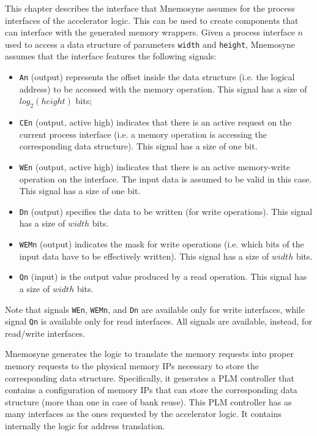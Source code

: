 This chapter describes the interface that {\sc Mnemosyne} assumes for
the process interfaces of the accelerator logic. This can be used to
create components that can interface with the generated memory
wrappers.
Given a process interface $n$ used to access a data structure of parameters {\tt width} and {\tt height}, {\sc
  Mnemosyne} assumes that the interface features the following signals:
\begin{itemize}
\item {\tt An} (output) represents the offset inside the data structure
(i.e. the logical address) to be accessed with the memory operation.  This
signal has a size of {\tt $log_2(height)$} bits;
\item {\tt CEn} (output, active high) indicates that there is an active
request on the current process interface (i.e. a memory operation is accessing
the corresponding data structure). This signal has a size of one bit.
\item {\tt WEn} (output, active high) indicates that there is an active
memory-write operation on the interface.  The input data is assumed to be valid
in this case. This signal has a size of one bit.
\item {\tt Dn} (output) specifies the data to be written (for
  write operations). This signal has a size of $width$ bits.
\item {\tt WEMn} (output) indicates the mask for write operations
  (i.e. which bits of the input data have to be effectively written). This
  signal has a size of $width$ bits.
\item {\tt Qn} (input) is the output value produced by a read
  operation. This signal has a size of $width$ bits.
\end{itemize}

\noindent Note that signals {\tt WEn}, {\tt WEMn}, and {\tt Dn} are
available only for write interfaces, while signal {\tt Qn} is
available only for read interfaces. All signals are available,
instead, for read/write interfaces.

{\sc Mnemosyne} generates the logic to translate the memory requests into
proper memory requests to the physical memory IPs necessary to store the
corresponding data structure. Specifically, it generates a PLM controller that
contains a configuration of memory IPs that can store the corresponding data
structure (more than one in case of bank reuse). This PLM controller has as many
interfaces as the ones requested by the accelerator logic. It contains
internally the logic for address translation.

